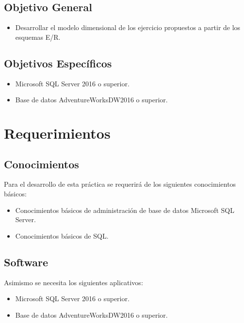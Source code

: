 \documentclass[12pt,letterpaper]{article}
\begin{document}
\subsection{\textbf{Objetivo General}}

\begin{itemize}
\item Desarrollar el modelo dimensional de los ejercicio propuestos a partir de los esquemas E/R.

\end{itemize}



\subsection{\textbf{Objetivos Específicos}}
\begin{itemize}
\item Microsoft SQL Server 2016 o superior.
\item Base de datos AdventureWorksDW2016 o superior.
\end{itemize}

\section {\textbf{Requerimientos}}

\subsection{\textbf{Conocimientos}}
Para el desarrollo de esta práctica se requerirá de los siguientes conocimientos básicos:
\begin{itemize}
\item Conocimientos básicos de administración de base de datos Microsoft SQL Server.
\item Conocimientos básicos de SQL.
\end{itemize}



\subsection{\textbf{Software}}
Asimismo se necesita los siguientes aplicativos:
\begin{itemize}
\item Microsoft SQL Server 2016 o superior.
\item Base de datos AdventureWorksDW2016 o superior.
\end{itemize}
\end{document}
